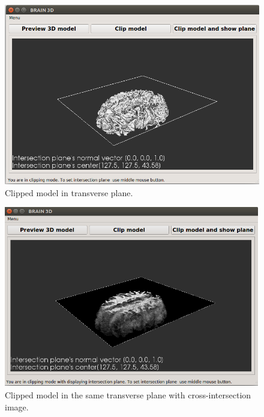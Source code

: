 \begin{figure}[H]
\centering{}\includegraphics[scale=0.7]{figures/Module_11/11_test_5.png}\caption{Clipped model in transverse plane. \label{fig:figures/11_test_5}}
\end{figure}
\begin{figure}[H]
\centering{}\includegraphics[scale=0.7]{figures/Module_11/11_test_6.png}\caption{Clipped model in the same transverse plane with cross-intersection image. \label{fig:figures/11_test_6}}
\end{figure}
